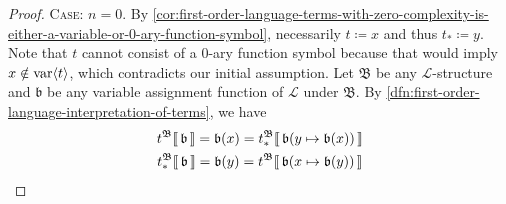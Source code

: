 \begin{proof}
    \vspace{0.3cm}
    \noindent
    {\scshape Case:} \( n = 0 \).
    By \cref{cor:first-order-language-terms-with-zero-complexity-is-either-a-variable-or-0-ary-function-symbol}, necessarily
    \( t \coloneq x \) and thus \( t_{\ast} \coloneq y \).
    Note that \( t \) cannot consist of a 0-ary function symbol because that would imply \( x \notin \operatorname{var} \langle t\rangle \), which contradicts our initial assumption.
    Let \( \mathfrak{B} \) be any \( \mathcal{L} \)-structure and \( \mathfrak{b} \) be any variable assignment function of \( \mathcal{L} \) under \( \mathfrak{B} \).
    By \cref{dfn:first-order-language-interpretation-of-terms}, we have
    \begin{gather*}
        \folterminterpretation{t}{\mathfrak{B}}{\mathfrak{b}}
        = \mathfrak{b}(x)
        = \folterminterpretation{t_{\ast}}{\mathfrak{B}}{ \folmodifiedvariableassignmentfunction{\mathfrak{b}}{y}{\mathfrak{b}(x)} }\\
        \folterminterpretation{t_{\ast}}{\mathfrak{B}}{\mathfrak{b}}
        = \mathfrak{b}(y)
        = \folterminterpretation{t}{\mathfrak{B}}{ \folmodifiedvariableassignmentfunction{\mathfrak{b}}{x}{\mathfrak{b}(y)} }
    \end{gather*}


\end{proof}

